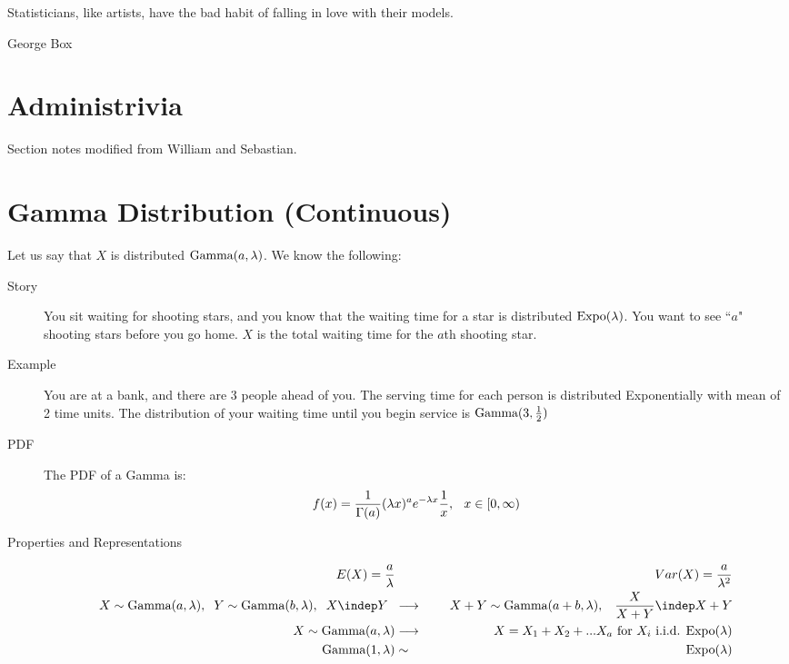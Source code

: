 \documentclass[11pt]{article}
\begin{document}


\setlength{\epigraphwidth}{.6\textwidth}
\epigraph{Statisticians, like artists, have the bad habit of falling in love with their models.}{George Box}

\section*{Administrivia}
Section notes modified from William and Sebastian.

\section*{Gamma Distribution (Continuous)}
\begin{description}
\item Let us say that $X$ is distributed $\textrm{Gamma}(a, \lambda)$. We know the following:
\begin{description}
  \item[Story] You sit waiting for shooting stars, and you know that the waiting time for a star is distributed $\textrm{Expo}(\lambda)$. You want to see ``$a$" shooting stars before you go home. $X$ is the total waiting time for the $a$th shooting star.
  \item[Example]  You are at a bank, and there are 3 people ahead of you. The serving time for each person is distributed Exponentially with mean of 2 time units. The distribution of your waiting time until you begin service is $\textrm{Gamma}(3, \frac{1}{2})$
  \item[PDF] The PDF of a Gamma is:
\begin{eqnarray*}
f(x) = \frac{1}{\Gamma(a)}(\lambda x)^ae^{-\lambda x}\frac{1}{x},
\hspace{.1 in}
x \in [0, \infty)
\end{eqnarray*}
  \item[Properties and Representations]
  \vspace{-.4 cm}
  \begin{eqnarray*}
    E(X) = \frac{a}{\lambda} && Var(X) = \frac{a}{\lambda^2} \\
    X \sim \Gam(a, \lambda), \hspace{.2 cm} Y \sim \Gam(b, \lambda), \hspace{.2 cm} X \indep Y \hspace{.2 cm} &\longrightarrow& \hspace{.5cm} X + Y \sim \Gam(a + b, \lambda), \hspace{.3cm} \frac{X}{X + Y} \indep X + Y \\
    X \sim \Gam(a, \lambda) &\longrightarrow& X = X_1 + X_2 + ... X_a \textnormal{ for $X_i$ i.i.d. $\Expo(\lambda)$} \\
    \Gam(1, \lambda) &\sim& \Expo(\lambda)
  \end{eqnarray*}
\end{description}
\end{description}
\end{document}
